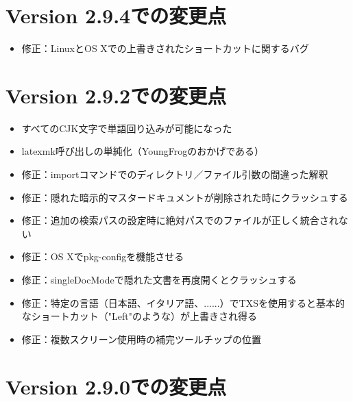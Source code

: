 \section{Version 2.9.4での変更点}

\begin{itemize}
    \item
      修正：LinuxとOS Xでの上書きされたショートカットに関するバグ
\end{itemize}

\section{Version 2.9.2での変更点}

\begin{itemize}
    \item
      すべてのCJK文字で単語回り込みが可能になった
    \item
      latexmk呼び出しの単純化（YoungFrogのおかげである）
    \item
      修正：importコマンドでのディレクトリ／ファイル引数の間違った解釈
    \item
      修正：隠れた暗示的マスタードキュメントが削除された時にクラッシュする
    \item
      修正：追加の検索パスの設定時に絶対パスでのファイルが正しく統合されない
    \item
      修正：OS Xでpkg-configを機能させる
    \item
      修正：singleDocModeで隠れた文書を再度開くとクラッシュする
    \item
      修正：特定の言語（日本語、イタリア語、......）でTXSを使用すると基本的なショートカット（"Left"のような）が上書きされ得る
    \item
      修正：複数スクリーン使用時の補完ツールチップの位置
\end{itemize}

\section{Version 2.9.0での変更点}

